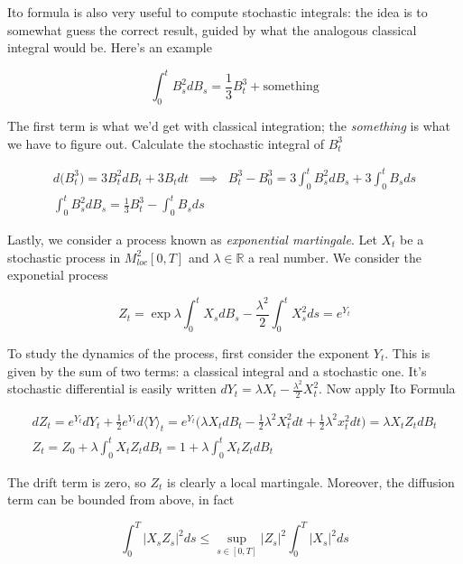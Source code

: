 Ito formula is also very useful to compute stochastic integrals: the idea is to somewhat guess the correct result, guided by what the analogous classical integral would be. Here's an example


\begin{equation*}
    \int_0^t B_s^2 dB_s = \frac{1}{3} B_t^3 + \text{something}
\end{equation*}

The first term is what we'd get with classical integration; the \textit{something} is what we have to figure out. Calculate the stochastic integral of $B_t^3$

\begin{gather*}
    d\big( B_t^3 \big) = 3 B_t^2 dB_t + 3 B_t dt \;\; \implies \;\; B_t^3 - B_0^3 = 3\int_0^t B_s^2 dB_s + 3 \int_0^t B_s ds \\
    \int_0^t B_s^2 dB_s = \frac{1}{3} B_t^3 - \int_0^t B_s ds
\end{gather*}

Lastly, we consider a process known as \textit{exponential martingale}. Let $X_t$ be a stochastic process in $M^2_{loc}[0,T]$ and $\lambda \in \mathbb{R}$ a real number. We consider the exponetial process

\begin{equation}
    Z_t = \exp{ \lambda \int_0^t X_s dB_s - \frac{\lambda^2}{2} \int_0^t X_s^2 ds} = e^{Y_t}
\end{equation}

To study the dynamics of the process, first consider the exponent $Y_t$. This is given by the sum of two terms: a classical integral and a stochastic one. It's stochastic differential is easily written $dY_t = \lambda X_t - \frac{\lambda^2}{2} X_t^2$. Now apply Ito Formula

\begin{gather*}
    d Z_t = e^{Y_t} dY_t + \frac{1}{2} e^{Y_t} d \langle Y \rangle_t = e^{Y_t} \Big( \lambda X_t dB_t - \frac{1}{2} \lambda^2 X_t^2 dt + \frac{1}{2} \lambda^2 x_t^2 dt \Big) = \lambda X_t Z_t dB_t \\ 
    Z_t = Z_0 + \lambda \int_0^t X_t Z_t dB_t = 1+ \lambda \int_0^t X_t Z_t dB_t 
\end{gather*}

The drift term is zero, so $Z_t$ is clearly a local martingale. Moreover, the diffusion term can be bounded from above, in fact

\begin{equation*}
    \int_0^T \vert X_s Z_s \vert^2 ds \leq \sup_{s \in [0,T]} \vert Z_s \vert^2 \int_0^T \vert X_s \vert^2 ds 
\end{equation*}

